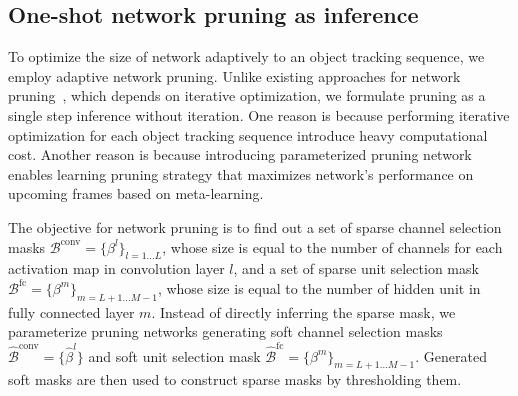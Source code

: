 \documentclass[letterpaper]{article} %
\begin{document}
\subsection{One-shot network pruning as inference}

To optimize the size of network adaptively to an object tracking sequence, we employ adaptive network pruning.
Unlike existing approaches for network pruning~\cite{prune_iter,sparsity,lassoprune}, which depends on iterative optimization, we formulate pruning as a single step inference without iteration.
One reason is because performing iterative optimization for each object tracking sequence introduce heavy computational cost.
Another reason is because introducing parameterized pruning network enables learning pruning strategy that maximizes network's performance on upcoming frames based on meta-learning.

The objective for network pruning is to find out a set of sparse channel selection masks $\mathcal{B}^\text{conv}=\{\beta^l\}_{l=1...L}$, whose size is equal to the number of channels for each activation map in convolution layer $l$, and a set of sparse unit selection mask $\mathcal{B}^\text{fc}=\{\beta^m\}_{m=L+1...M-1}$, whose size is equal to the number of hidden unit in fully connected layer $m$.
Instead of directly inferring the sparse mask, we parameterize pruning networks generating soft channel selection masks $\hat{\mathcal{B}}^\text{conv}=\{\hat{\beta}^l\}$ and soft unit selection mask $\hat{\mathcal{B}}^\text{fc}=\{\beta^m\}_{m=L+1...M-1}$.
Generated soft masks are then used to construct sparse masks by thresholding them.
\end{document}
